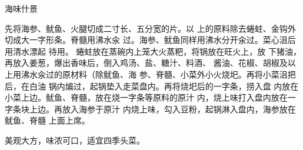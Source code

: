\begin{recipe}{海味什景}

\ingredients


\cooking

\step 先将海参、鱿鱼、火腿切成二寸长、五分宽的片。以 上的原料除去蜷蛀、金钩外切成大一字形条。脊髓用沸水汆 过。海参、鱿鱼同样用沸水分开汆过。菜心沮后用清水漂起 待用。
\step 蜷蛀放在蒸碗内上笼大火蒸粑，将锅放在旺火上，放 下猪油，再放入姜葱，爆出香味后，倒入鸡汤、盐、糖汁、料酒、 酱油、花椒、胡椒及以上用沸水汆过的原材料（除鱿鱼、海 参、脊髓、小菜外小火烧圯。再将小菜沮把后，在白油 锅内煸过，起锅垫入走菜盘内。再将烧圯后的一字条，捞入盘 内放在小菜上边。鱿鱼、脊髓，放在烧一字条等原料的原汁
内，烧上味打入盘内放在一字条块上边。再放入海参于原汁 内烧上味，勾入豆粉，起锅淋入盘内，海参放在鱿鱼、脊髓 上面上席。

\notes

美观大方，味浓可口，适宜四季头菜。

\end{recipe}

